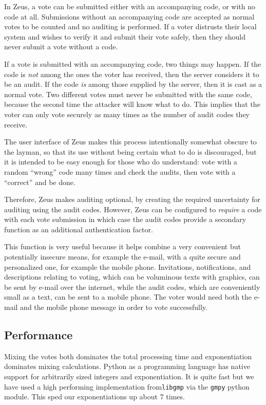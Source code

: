 \documentclass[letterpaper,10pt]{article}
\begin{document}
In Zeus, a vote can be submitted either with an accompanying code,
or with no code at all.
Submissions without an accompanying code are accepted
as normal votes to be counted and no auditing is performed.
If a voter distrusts their local system and wishes to verify it
and submit their vote safely, then they should never submit
a vote without a code.

If a vote is submitted with an accompanying code, two things may happen.
If the code is \emph{not} among the ones the voter has received, then
the server considers it to be an audit.
If the code \emph{is} among those supplied by the server,
then it is cast as a normal vote.
Two different votes must never be submitted with the same code, because
the second time the attacker will know what to do.
This implies that the voter can only vote securely as many times as the
number of audit codes they receive.

The user interface of Zeus makes this process intentionally somewhat
obscure to the layman, so that its use without being certain what to
do is discouraged, but it is intended to be easy enough for those who
do understand: vote with a random ``wrong'' code many times and check
the audits, then vote with a ``correct'' and be done.

Therefore, Zeus makes auditing optional, by creating the required
uncertainty for auditing using the audit codes.
However, Zeus can be configured to \emph{require} a code with each vote
submission in which case the audit codes provide a secondary function
as an additional authentication factor.

This function is very useful because it helps combine a very convenient
but potentially insecure means, for example the e-mail,
with a quite secure and personalized one, for example the mobile phone.
Invitations, notifications, and descriptions relating to voting,
which can be voluminous texts with graphics,
can be sent by e-mail over the internet,
while the audit codes, which are conveniently small as a text,
can be sent to a mobile phone.
The voter would need both the e-mail and the mobile phone message in
order to vote successfully.

\subsection{Performance}
\label{sec:performance}
Mixing the votes both dominates the total processing time
and exponentiation dominates mixing calculations.
Python as a programming language has native support for arbitrarily
sized integers and exponentiation.
It is quite fast but we have used a high performing implementation
from\texttt{libgmp} via the \texttt{gmpy} python module.
This sped our exponentiations up about 7 times.
\end{document}
